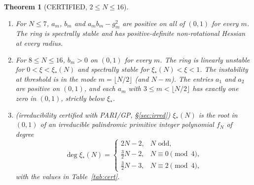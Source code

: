 \documentclass[11pt]{article}
\newtheorem{theorem}{Theorem}
\theoremstyle{remark}
\begin{document}
\begin{theorem}[CERTIFIED, $2\le N\le16$]\label{thm:cert}
\begin{enumerate}
\item[(a)] For $N\le7$, $a_m$, $b_m$ and $a_mb_m-g_m^2$ are positive on all of $(0,1)$ for every $m$. The ring is spectrally
stable and has positive-definite non-rotational Hessian at every radius.
\item[(b)] For $8\le N\le16$, $b_m>0$ on $(0,1)$ for every $m$. The ring is linearly unstable for $0<\xi<\xi_*(N)$ and
spectrally stable for $\xi_*(N)<\xi<1$. The instability at threshold is in the mode $m=\lfloor N/2\rfloor$ (and $N-m$).
The entries $a_1$ and $a_2$ are positive on $(0,1)$, and each $a_m$ with $3\le m<\lfloor N/2\rfloor$ has exactly one zero in
$(0,1)$, strictly below $\xi_*$.
\item[(c)] (irreducibility certified with PARI/GP, \S\ref{sec:irred}) $\xi_*(N)$ is the root in $(0,1)$ of an irreducible
palindromic primitive integer polynomial $f_N$ of degree
\begin{equation}\label{eq:deg}
\deg\xi_*(N)=\begin{cases}2N-2,&N\text{ odd},\\ \tfrac32N-2,&N\equiv0\pmod4,\\ \tfrac32N-3,&N\equiv2\pmod 4,\end{cases}
\end{equation}
with the values in Table~\ref{tab:cert}.
\end{enumerate}
\end{theorem}
\end{document}
